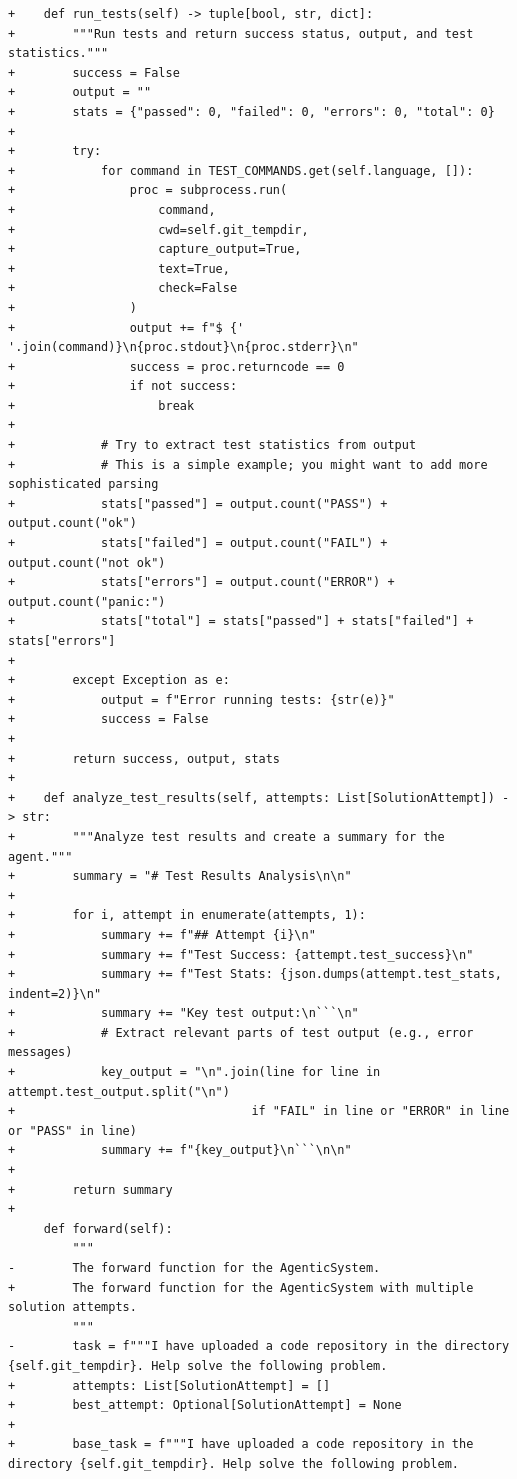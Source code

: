\documentclass{article}
\begin{document}
\begin{lstlisting}[style=diffstyle]
+    def run_tests(self) -> tuple[bool, str, dict]:
+        """Run tests and return success status, output, and test statistics."""
+        success = False
+        output = ""
+        stats = {"passed": 0, "failed": 0, "errors": 0, "total": 0}
+
+        try:
+            for command in TEST_COMMANDS.get(self.language, []):
+                proc = subprocess.run(
+                    command, 
+                    cwd=self.git_tempdir,
+                    capture_output=True,
+                    text=True,
+                    check=False
+                )
+                output += f"$ {' '.join(command)}\n{proc.stdout}\n{proc.stderr}\n"
+                success = proc.returncode == 0
+                if not success:
+                    break
+
+            # Try to extract test statistics from output
+            # This is a simple example; you might want to add more sophisticated parsing
+            stats["passed"] = output.count("PASS") + output.count("ok")
+            stats["failed"] = output.count("FAIL") + output.count("not ok")
+            stats["errors"] = output.count("ERROR") + output.count("panic:")
+            stats["total"] = stats["passed"] + stats["failed"] + stats["errors"]
+            
+        except Exception as e:
+            output = f"Error running tests: {str(e)}"
+            success = False
+
+        return success, output, stats
+
+    def analyze_test_results(self, attempts: List[SolutionAttempt]) -> str:
+        """Analyze test results and create a summary for the agent."""
+        summary = "# Test Results Analysis\n\n"
+        
+        for i, attempt in enumerate(attempts, 1):
+            summary += f"## Attempt {i}\n"
+            summary += f"Test Success: {attempt.test_success}\n"
+            summary += f"Test Stats: {json.dumps(attempt.test_stats, indent=2)}\n"
+            summary += "Key test output:\n```\n"
+            # Extract relevant parts of test output (e.g., error messages)
+            key_output = "\n".join(line for line in attempt.test_output.split("\n") 
+                                 if "FAIL" in line or "ERROR" in line or "PASS" in line)
+            summary += f"{key_output}\n```\n\n"
+
+        return summary
+
     def forward(self):
         """
-        The forward function for the AgenticSystem.
+        The forward function for the AgenticSystem with multiple solution attempts.
         """
-        task = f"""I have uploaded a code repository in the directory {self.git_tempdir}. Help solve the following problem.
+        attempts: List[SolutionAttempt] = []
+        best_attempt: Optional[SolutionAttempt] = None
+
+        base_task = f"""I have uploaded a code repository in the directory {self.git_tempdir}. Help solve the following problem.
 

\end{lstlisting}
\end{document}
